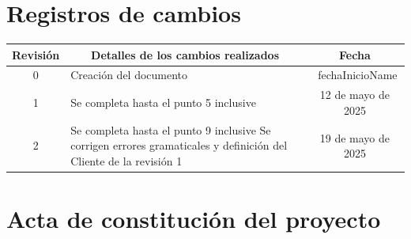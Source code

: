 \documentclass[
11pt, %
]{charter}
\begin{document}
\maketitle
\thispagestyle{empty}
\pagebreak


\thispagestyle{empty}
{\setlength{\parskip}{0pt}
\tableofcontents{}
}
\pagebreak


\section*{Registros de cambios}
\label{sec:registro}


\begin{table}[ht]
\label{tab:registro}
\centering
\begin{tabularx}{\linewidth}{@{}|c|X|c|@{}}
\hline
\rowcolor[HTML]{C0C0C0} 
Revisión & \multicolumn{1}{c|}{\cellcolor[HTML]{C0C0C0}Detalles de los cambios realizados} & Fecha	\\ \hline
0      & Creación del documento                                 &\ fechaInicioName					\\ \hline
1      & Se completa hasta el punto 5 inclusive                 & {12} de {mayo} de 2025			\\ \hline
2      & Se completa hasta el punto 9 inclusive \newline Se corrigen errores gramaticales y definición del Cliente de la revisión 1	& {19} de {mayo} de 2025			\\ \hline


\end{tabularx}
\end{table}

\pagebreak



\section*{Acta de constitución del proyecto}
\label{sec:acta}
\end{document}
